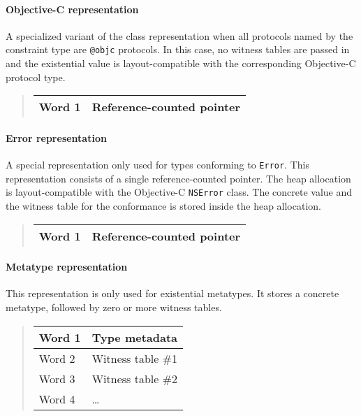 \documentclass[../generics]{subfiles}
\begin{document}
\paragraph{Objective-C representation} A specialized variant of the class representation when all protocols named by the constraint type are \texttt{@objc} protocols. In this case, no witness tables are passed in and the existential value is layout-compatible with the corresponding Objective-C protocol type.

\begin{quote}
\begin{tabular}{|l|l|}
\hline
Word 1&Reference-counted pointer\\
\hline
\end{tabular}
\end{quote}

\paragraph{Error representation} A special representation only used for types conforming to \texttt{Error}. This representation consists of a single reference-counted pointer. The heap allocation is layout-compatible with the Objective-C \texttt{NSError} class. The concrete value and the witness table for the conformance is stored inside the heap allocation.

\begin{quote}
\begin{tabular}{|l|l|}
\hline
Word 1&Reference-counted pointer\\
\hline
\end{tabular}
\end{quote}

\paragraph{Metatype representation} This representation is only used for existential metatypes. It stores a concrete metatype, followed by zero or more witness tables.

\begin{quote}
\begin{tabular}{|l|l|}
\hline
Word 1&Type metadata\\
\hline
\hline
Word 2&Witness table \#1\\
Word 3&Witness table \#2\\
Word 4&\ldots\\
\hline
\end{tabular}
\end{quote}
\end{document}
